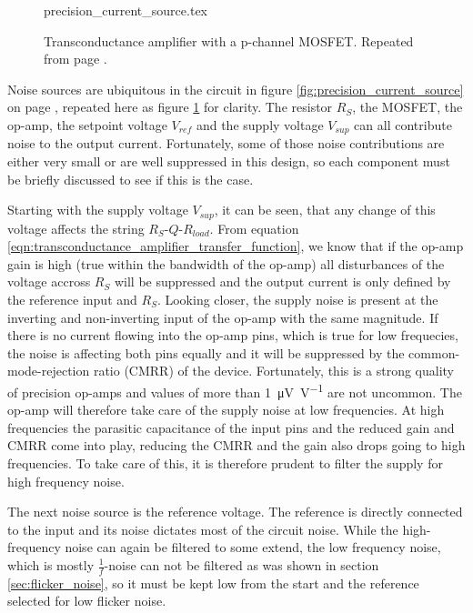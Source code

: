 \begin{figure}[ht]
    \centering
    {precision_current_source.tex}
    \caption{Transconductance amplifier with a p-channel MOSFET. Repeated from page \pageref{fig:precision_current_source}.}
    \label{fig:precision_current_source_noise}
\end{figure}

Noise sources are ubiquitous in the circuit in figure \ref{fig:precision_current_source} on page \pageref{fig:precision_current_source}, repeated here as figure \ref{fig:precision_current_source_noise} for clarity. The resistor $R_S$, the MOSFET, the op-amp, the setpoint voltage $V_{ref}$ and the supply voltage $V_{sup}$ can all contribute noise to the output current. Fortunately, some of those noise contributions are either very small or are well suppressed in this design, so each component must be briefly discussed to see if this is the case.

Starting with the supply voltage $V_{sup}$, it can be seen, that any change of this voltage affects the string $R_S$-$Q$-$R_{load}$. From equation \ref{eqn:transconductance_amplifier_transfer_function}, we know that if the op-amp gain is high (true within the bandwidth of the op-amp) all disturbances of the voltage accross $R_S$ will be suppressed and the output current is only defined by the reference input and $R_S$. Looking closer, the supply noise is present at the inverting and non-inverting input of the op-amp with the same magnitude. If there is no current flowing into the op-amp pins, which is true for low frequecies, the noise is affecting both pins equally and it will be suppressed by the common-mode-rejection ratio (CMRR) of the device. Fortunately, this is a strong quality of precision op-amps and values of more than \qty[per-mode=power]{1}{\uV \per \volt} are not uncommon. The op-amp will therefore take care of the supply noise at low frequencies. At high frequencies the parasitic capacitance of the input pins and the reduced gain and CMRR come into play, reducing the CMRR and the gain also drops going to high frequencies. To take care of this, it is therefore prudent to filter the supply for high frequency noise.

The next noise source is the reference voltage. The reference is directly connected to the input and its noise dictates most of the circuit noise. While the high-frequency noise can again be filtered to some extend, the low frequency noise, which is mostly $\frac{1}{f}$-noise can not be filtered as was shown in section \ref{sec:flicker_noise}, so it must be kept low from the start and the reference selected for low flicker noise.

